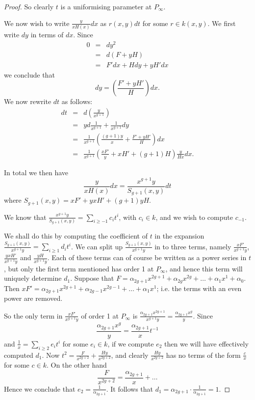 \documentclass[draft, 11pt]{article} %
\theoremstyle{plain}
\theoremstyle{remark}
\begin{document}
\begin{proof}
So clearly $t$ is a uniformising parameter at $P_\infty$.

We now wish to write $\frac{y}{xH(x)}dx$ as $r(x,y)dt$ for some $r \in k(x,y)$.
We first write $dy$ in terms of $dx$.
Since
\begin{eqnarray*}
0 & = & dy^2 \\
& = & d(F+yH) \\
& = & F'dx + Hdy + yH'dx
\end{eqnarray*}
we conclude that
\[
dy = \left( \frac{F'+yH'}{H} \right) dx.
\]
We now rewrite $dt$ as follows:
\begin{eqnarray*}
dt & = & d\left( \frac{y}{x^{g+1}} \right) \\
& = & yd\frac{1}{x^{g+1}} + \frac{1}{x^{g+1}}dy \\
& = & \frac{1}{x^{g+1}} \left( \frac{(g+1)y}{x} + \frac{F'+yH'}{H} \right) dx \\
& = & \frac{1}{x^{g+1}} \left( \frac{xF'}{y} + xH' + (g+1)H \right) \frac{y}{Hx} dx.
\end{eqnarray*}

In total we then have
\[
\frac{y}{xH(x)}dx = \frac{x^{g+1}y}{S_{g+1}(x,y)}dt
\]
where $S_{g+1}(x,y) = xF' + yxH' + (g+1)yH$.

We know that $\frac{x^{g+1}y}{S_{g+1}(x,y)} = \sum_{i\geq -1} c_i t^i$, with $c_i \in k$, and we wish to compute $c_{-1}$.


We shall do this by computing the coefficient of $t$ in the expansion $\frac{S_{g+1}(x,y)}{x^{g+1}y} = \sum_{i\geq 1}d_it^i$.
We can split up $\frac{S_{g+1}(x,y)}{x^{g+1}y}$ in to three terms, namely $\frac{xF'}{x^{g+1}y}$, $\frac{yxH'}{x^{g+1}y}$ and $\frac{yH}{x^{g+1}y}$.
Each of these terms can of course be written as a power series in $t$, but only the first term mentioned has order 1 at $P_\infty$, and hence this term will uniquely determine $d_1$.
Suppose that $F = \alpha_{2g+1}x^{2g+1} + \alpha_{2g}x^{2g} + \ldots + \alpha_1x^1 + \alpha_0$.
Then $xF'= \alpha_{2g+1}x^{2g+1} + \alpha_{2g-1}x^{2g-1} + \ldots + \alpha_1x^1$; i.e. the terms with an even power are removed.

So the only term in $\frac{xF'}{x^{g+1}y}$ of order 1 at $P_\infty$ is $\frac{\alpha_{2g+1}x^{2g+1}}{x^{g+1}y} = \frac{\alpha_{2g+1}x^{g}}{y}$.
Since
\[
\frac{\alpha_{2g+1}x^g}{y} = \frac{\alpha_{2g+1}}{x}t^{-1}
\]
and $\frac{1}{x} = \sum_{i\geq 2}e_it^i$ for some $e_i \in k$, if we compute $e_2$ then we will have effectively computed $d_1$.
Now $t^2 = \frac{F }{x^{2g+2}}+ \frac{Hy}{x^{2g+2}}$, and clearly $\frac{Hy}{x^{2g+2}}$ has no terms of the form $\frac{c}{x}$ for some $c \in k$.
On the other hand
\[
\frac{F}{x^{2g+2}} = \frac{\alpha_{2g+1}}{x} + \ldots
\]
Hence we conclude that $e_2 = \frac{1}{\alpha_{2g+1}}$.
It follows that $d_1 = \alpha_{2g+1} \cdot \frac{1}{\alpha_{2g+1}} = 1$.



\end{proof}
\end{document}
